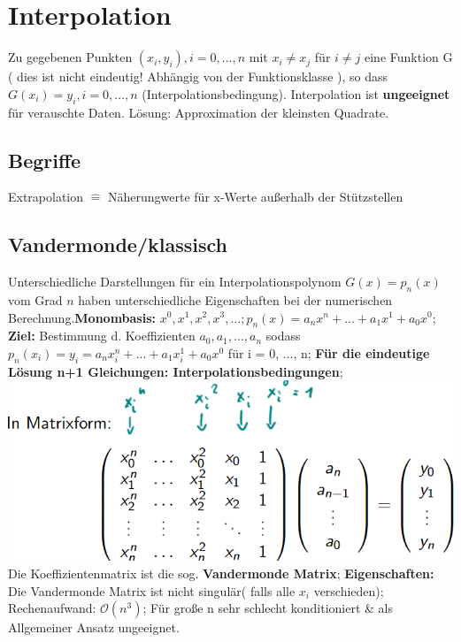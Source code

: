 \section{Interpolation}
Zu gegebenen Punkten $ ( x_{i}, y_{i} ), i=0, ..., n $ mit $ x_{i} \neq x_{j} $ für $ i \neq  j $ eine Funktion G ( dies ist nicht eindeutig! Abhängig von der Funktionsklasse ), so dass $ G ( x_{i} ) = y_{i}, i=0, ..., n $ (Interpolationsbedingung). Interpolation ist \textbf{ungeeignet} für verauschte Daten. Lösung: Approximation der kleinsten Quadrate.

\subsection{Begriffe}
Extrapolation $\hat{=} $ Näherungwerte für x-Werte außerhalb der Stützstellen

\subsection{Vandermonde/klassisch}
Unterschiedliche Darstellungen für ein Interpolationspolynom $ G(x) = p_{n}(x) $ vom Grad $ n $ haben unterschiedliche Eigenschaften bei der numerischen Berechnung.\textbf{Monombasis:} $ x^{0}, x^{1}, x^{2}, x^{3}, ...; p_{n}(x) = a_{n} x^n + ... + a_{1} x^{1} + a_{0} x^{0} $; 
\textbf{Ziel:} Bestimmung d. Koeffizienten $ a_{0}, a_{1}, ..., a_{n} $ sodass $ p_{n}( x_{i} ) = y_{i} = a_{n} x_{i}^n + ... + a_{1} x_{i}^1 +a_{0} x^{0} $ für i = 0, ..., n; 
\textbf{Für die eindeutige Lösung n+1 Gleichungen: Interpolationsbedingungen};
\includegraphics[scale=0.25]{./pic/VandermondeMatrix.png}
Die Koeffizientenmatrix ist die sog. \textbf{Vandermonde Matrix}; \textbf{Eigenschaften:} Die Vandermonde Matrix ist nicht singulär( falls alle $ x_{i} $ verschieden); Rechenaufwand: $ \mathcal O ( n^{3} ) $; Für große n sehr schlecht konditioniert \& als Allgemeiner Ansatz ungeeignet.

